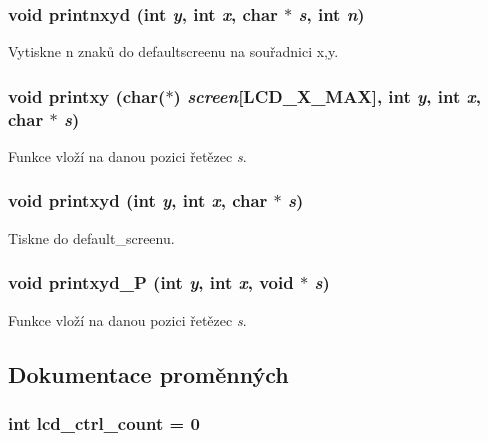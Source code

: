 \subsubsection[{printnxyd}]{\setlength{\rightskip}{0pt plus 5cm}void printnxyd (int {\em y}, \/  int {\em x}, \/  char $\ast$ {\em s}, \/  int {\em n})}\label{lcd_8c_a9b70b5f13bd19a1a5ff3de4221c1dc72}


Vytiskne n znaků do defaultscreenu na souřadnici x,y. 
\subsubsection[{printxy}]{\setlength{\rightskip}{0pt plus 5cm}void printxy (char($\ast$) {\em screen}[LCD\_\-X\_\-MAX], \/  int {\em y}, \/  int {\em x}, \/  char $\ast$ {\em s})}\label{lcd_8c_a4aaab14a959b518f3d8191174a94b485}


Funkce vloží na danou pozici řetězec {\itshape s\/}. 
\subsubsection[{printxyd}]{\setlength{\rightskip}{0pt plus 5cm}void printxyd (int {\em y}, \/  int {\em x}, \/  char $\ast$ {\em s})}\label{lcd_8c_af14cee58cda35b9331b261be186b3dd9}


Tiskne do default\_\-screenu. 
\subsubsection[{printxyd\_\-P}]{\setlength{\rightskip}{0pt plus 5cm}void printxyd\_\-P (int {\em y}, \/  int {\em x}, \/  void $\ast$ {\em s})}\label{lcd_8c_ac49e278f3e1c0c3472a70b8c6efc5051}


Funkce vloží na danou pozici řetězec {\itshape s\/}. 

\subsection{Dokumentace proměnných}
\subsubsection[{lcd\_\-ctrl\_\-count}]{\setlength{\rightskip}{0pt plus 5cm}int {\bf lcd\_\-ctrl\_\-count} = 0}\label{lcd_8c_a1fabb9483b10918d452fee90b071d54c}
